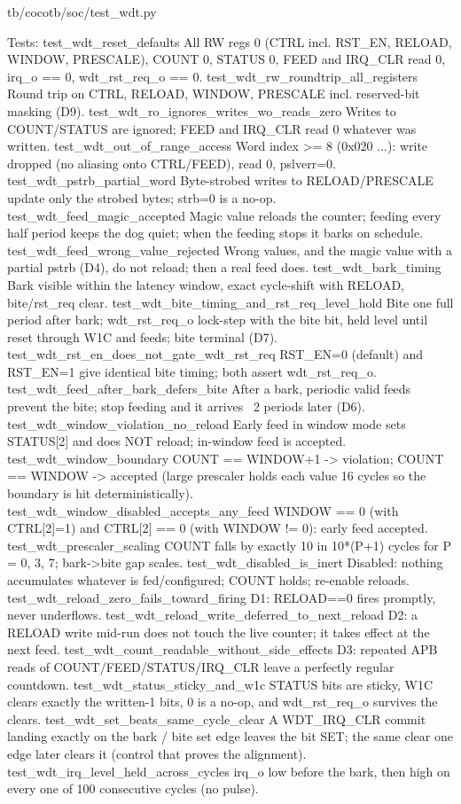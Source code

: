 \begin{relocated}{tb/cocotb/soc/test_wdt.py}
\begin{textblock}
Tests:
test_wdt_reset_defaults
All RW regs 0 (CTRL incl. RST_EN, RELOAD, WINDOW, PRESCALE), COUNT 0, STATUS 0, FEED and
IRQ_CLR read 0, irq_o == 0, wdt_rst_req_o == 0.
test_wdt_rw_roundtrip_all_registers
Round trip on CTRL, RELOAD, WINDOW, PRESCALE incl. reserved-bit masking (D9).
test_wdt_ro_ignores_writes_wo_reads_zero
Writes to COUNT/STATUS are ignored; FEED and IRQ_CLR read 0 whatever was written.
test_wdt_out_of_range_access
Word index >= 8 (0x020 ...): write dropped (no aliasing onto CTRL/FEED), read 0, pslverr=0.
test_wdt_pstrb_partial_word
Byte-strobed writes to RELOAD/PRESCALE update only the strobed bytes; strb=0 is a no-op.
test_wdt_feed_magic_accepted
Magic value reloads the counter; feeding every half period keeps the dog quiet; when the
feeding stops it barks on schedule.
test_wdt_feed_wrong_value_rejected
Wrong values, and the magic value with a partial pstrb (D4), do not reload; then a real feed
does.
test_wdt_bark_timing
Bark visible within the latency window, exact cycle-shift with RELOAD, bite/rst_req clear.
test_wdt_bite_timing_and_rst_req_level_hold
Bite one full period after bark; wdt_rst_req_o lock-step with the bite bit, held level until
reset through W1C and feeds; bite terminal (D7).
test_wdt_rst_en_does_not_gate_wdt_rst_req
RST_EN=0 (default) and RST_EN=1 give identical bite timing; both assert wdt_rst_req_o.
test_wdt_feed_after_bark_defers_bite
After a bark, periodic valid feeds prevent the bite; stop feeding and it arrives ~2 periods
later (D6).
test_wdt_window_violation_no_reload
Early feed in window mode sets STATUS[2] and does NOT reload; in-window feed is accepted.
test_wdt_window_boundary
COUNT == WINDOW+1 -> violation; COUNT == WINDOW -> accepted (large prescaler holds each
value 16 cycles so the boundary is hit deterministically).
test_wdt_window_disabled_accepts_any_feed
WINDOW == 0 (with CTRL[2]=1) and CTRL[2] == 0 (with WINDOW != 0): early feed accepted.
test_wdt_prescaler_scaling
COUNT falls by exactly 10 in 10*(P+1) cycles for P = 0, 3, 7; bark->bite gap scales.
test_wdt_disabled_is_inert
Disabled: nothing accumulates whatever is fed/configured; COUNT holds; re-enable reloads.
test_wdt_reload_zero_fails_toward_firing
D1: RELOAD==0 fires promptly, never underflows.
test_wdt_reload_write_deferred_to_next_reload
D2: a RELOAD write mid-run does not touch the live counter; it takes effect at the next feed.
test_wdt_count_readable_without_side_effects
D3: repeated APB reads of COUNT/FEED/STATUS/IRQ_CLR leave a perfectly regular countdown.
test_wdt_status_sticky_and_w1c
STATUS bits are sticky, W1C clears exactly the written-1 bits, 0 is a no-op, and
wdt_rst_req_o survives the clears.
test_wdt_set_beats_same_cycle_clear
A WDT_IRQ_CLR commit landing exactly on the bark / bite set edge leaves the bit SET; the
same clear one edge later clears it (control that proves the alignment).
test_wdt_irq_level_held_across_cycles
irq_o low before the bark, then high on every one of 100 consecutive cycles (no pulse).
\end{textblock}

\end{relocated}

